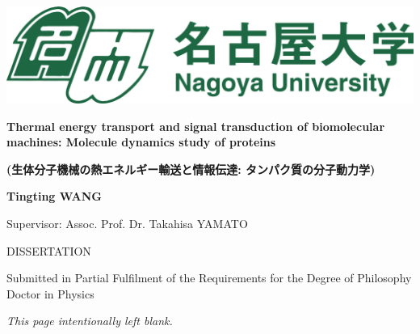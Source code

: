\documentclass[12pt, oneside]{article}
\begin{document}
\graphicspath{ {figures/titlepage/} }
 
\thispagestyle{empty}
\begin{center}
\begin{minipage}{1\linewidth}
    \centering
    \includegraphics[width=0.7\linewidth]{images.png}\par
    \vspace{1cm}
    {{\Large \textbf {Thermal energy transport and signal transduction of biomolecular machines: Molecule dynamics study of proteins}\par}}
    \begin{CJK}{UTF8}{min}
    {{\Large \textbf {(生体分子機械の熱エネルギー輸送と情報伝達: 
    \newline タンパク質の分子動力学)}\par}}
    \end{CJK}
    \vspace{2cm}
    {\Large \textbf {Tingting WANG}\par}
    \vspace{1cm}
    {\Large Supervisor: Assoc. Prof. Dr. Takahisa YAMATO \par}
    \vspace{1.5cm}
    {\Large DISSERTATION \par
    Submitted in Partial Fulfilment of the Requirements 
    for the Degree of 
    Philosophy Doctor in Physics\par}
    \vspace{1.5cm}
    {\Large  \linespread{1.5}{
    Computational Biophysics Laboratory (B-Lab) \par
    Graduate School of Science \par
    September 2023 \par}}
\end{minipage}
\end{center}
\clearpage

\newpage
\begin{center}
\textit{This page intentionally left blank.}
\end{center}
\thispagestyle{empty}\newpage
\end{document}
